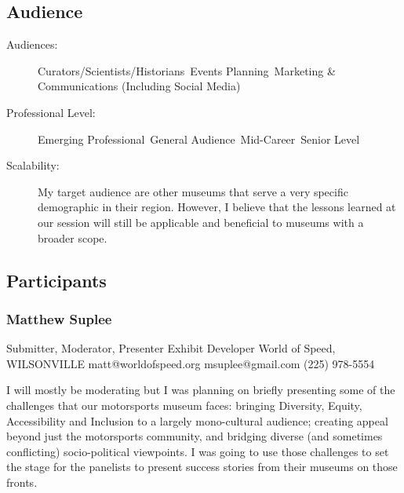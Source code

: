 \documentclass{report}
\begin{document}
              \subsection*{Audience}
                \begin{description}
                  \item [Audiences:]Curators/Scientists/Historians~Events Planning~Marketing \& Communications (Including Social Media)~
                  \item[Professional Level:]Emerging Professional~General Audience~Mid-Career~Senior Level~
                \item[Scalability:] My target audience are other museums that serve a very specific demographic in their region. However, I believe that the lessons learned at our session will still be applicable and beneficial to museums with a broader scope.

							
              \end{description}
            \subsection*{Participants}
              \subsubsection*{ Matthew Suplee }
              Submitter, Moderator, Presenter\newline
              Exhibit Developer\newline
              World of Speed, WILSONVILLE
              \newline
              matt@worldofspeed.org\newline
              msuplee@gmail.com\newline
              (225) 978-5554\newline

              I will mostly be moderating but I was planning on briefly presenting some of the challenges that our motorsports museum faces: bringing Diversity, Equity, Accessibility and Inclusion to a largely mono-cultural audience; creating appeal beyond just the motorsports community, and bridging diverse (and sometimes conflicting) socio-political viewpoints. I was going to use those challenges to set the stage for the panelists to present success stories from their museums on those fronts.\newline
\end{document}
